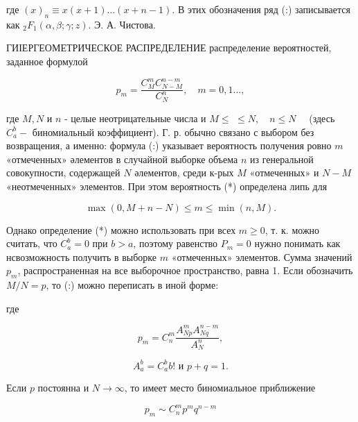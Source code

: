 \documentclass[10pt]{article}
\begin{document}
где $(x)_{n} \equiv x(x+1) \ldots(x+n-1)$. В этих обозначения ряд (:) записывается как ${ }_{2} F_{1}(\alpha, \beta ; \gamma ; z)$. Э. А. Чистова.



ГИІЕРГЕОМЕТРИЧЕСКОЕ РАСПРЕДЕЛЕНИЕ распределение вероятностей, заданное формулой



\[

p_{m}=\frac{C_{M}^{m} C_{N-M}^{n-m}}{C_{N}^{n}}, \quad m=0,1 \ldots,

\]



где $M, N$ и $n$ - целые неотрицательные числа и $M \leqslant$ $\leqslant N, \quad n \leqslant N \quad$ (здесь $C_{a}^{b}-$ биномиальный коэффициент). Г. р. обычно связано с выбором без возвращения, а именно: формула (:) указывает вероятность получения ровно $m$ «отмеченных» әлементов в случайной выборке объема $n$ из генеральной совокупности, содержащей $N$ әлементов, среди к-рых $M$ «отмеченных» и $N-M$ «неотмеченных» элементов. При этом вероятность (*) определена липь для



\[

\max (0, M+n-N) \leqslant m \leqslant \min (n, M) .

\]



Однако определение (*) можно использовать при всех $m \geqslant 0$, т. к. можно считать, что $C_{a}^{b}=0$ при $b>a$, поэтому равенство $P_{m}=0$ нужно понимать как нсвозможность получить в выборке $m$ «отмеченных» элементов. Сумма значений $p_{m}$, распространенная на все выборочное пространство, равна 1. Если обозначить $M / N=p$, то (:) можно переписать в иной форме:



где



\[

p_{m}=C_{n}^{m} \frac{A_{N p}^{m} A_{N q}^{n-m}}{A_{N}^{n}},

\]



\[

A_{a}^{b}=C_{a}^{b} b ! \text { и } p+q=1 .

\]



Если $p$ постоянна и $N \rightarrow \infty$, то имеет место биномиальное приближение



\[

p_{m} \sim C_{n}^{m} p^{m} q^{n-m}

\]
\end{document}
